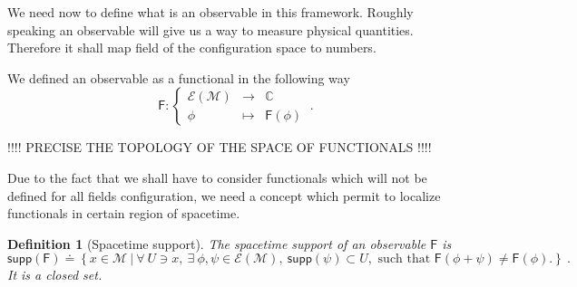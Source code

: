 \documentclass[10pt]{book}
\newcommand{\supp}{\mathsf{supp}}
\newcommand{\Ecal}{\mathcal{E}}
\newcommand{\Mcal}{\mathcal{M}}
\newcommand{\Cbb}{\mathbb{C}}
\newcommand{\Fsf}{\mathsf{F}}
\theoremstyle{break}
\newtheorem{definition}{Definition}
\begin{document}
We need now to define what is an observable in this framework. Roughly speaking an observable will give us a way to measure physical quantities. Therefore it shall map field of the configuration space to numbers.


\bigskip


We defined an observable as a functional in the following way
%
\begin{equation*}
\Fsf : \left\{
\begin{array}{ccc}
\Ecal(\Mcal) & \to     & \Cbb \\
\phi  & \mapsto & \Fsf(\phi)
\end{array}
\right. \ .
\end{equation*}


\bigskip


\begin{center}
!!!! PRECISE THE TOPOLOGY OF THE SPACE OF FUNCTIONALS !!!!
\end{center}


\bigskip


Due to the fact that we shall have to consider functionals which will not be defined for all fields configuration, we need a concept which permit to localize functionals in certain region of spacetime.


\begin{definition}[Spacetime support] 
The spacetime support of an observable $\Fsf$ is
%
\begin{equation*}
\supp(\Fsf) \doteq \left\{ x \in \Mcal \ \bigg| \ 
\forall \ U \ni x , \ \exists \ \phi, \psi \in \Ecal(\Mcal), \ \supp(\psi) \subset U, \mbox{ such that } \Fsf(\phi + \psi) \neq \Fsf(\phi).
\right\} \ .
\end{equation*}
It is a closed set.
%
\end{definition}


\end{document}
